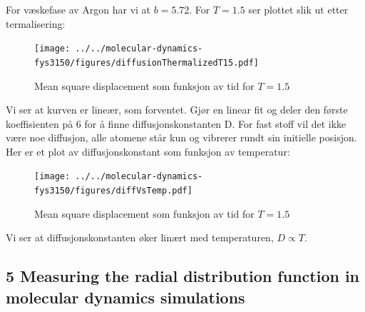 \documentclass[english, a4paper]{article}
\begin{document}
\noindent
For væskefase av Argon har vi at $b=5.72$. For $T=1.5$ ser plottet slik ut etter termalisering:
\begin{figure}[H]
  \begin{center}
  \texttt{[image: ../../molecular-dynamics-fys3150/figures/diffusionThermalizedT15.pdf]}
  \caption{Mean square displacement som funksjon av tid for $T = 1.5$}
  \label{fig:fig5}
  \end{center}
\end{figure}
Vi ser at kurven er lineær, som forventet. Gjør en linear fit og deler den første koeffisienten på 6
for å finne diffusjonskonstanten D. For fast stoff vil det ikke være noe diffusjon, alle 
atomene står kun og vibrerer rundt sin initielle posisjon. 
Her er et plot av diffusjonskonstant som funksjon av temperatur:
\begin{figure}[H]
  \begin{center}
  \texttt{[image: ../../molecular-dynamics-fys3150/figures/diffVsTemp.pdf]}
  \caption{Mean square displacement som funksjon av tid for $T = 1.5$}
  \label{fig:fig5}
  \end{center}
\end{figure}
Vi ser at diffusjonskonstanten øker linært med temperaturen, $D \propto T$. 

\subsection{5 Measuring the radial distribution function in molecular dynamics simulations}
\end{document}
